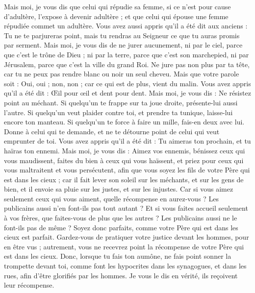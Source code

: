 \begin{multicols}{2}
Mais moi, je vous dis que celui qui répudie sa femme, si ce n'est pour cause d'adultère, l’expose à devenir adultère ; et que celui qui épouse une femme répudiée commet un adultère.
Vous avez aussi appris qu'il a été dit aux anciens : Tu ne te parjureras point, mais tu rendras au Seigneur ce que tu auras promis par serment.
Mais moi, je vous dis de ne jurer aucunement, ni par le ciel, parce que c'est le trône de Dieu ;
ni par la terre, parce que c'est son marchepied, ni par Jérusalem, parce que c'est la ville du grand Roi.
Ne jure pas non plus par ta tête, car tu ne peux pas rendre blanc ou noir un seul cheveu.
Mais que votre parole soit : Oui, oui ; non, non ; car ce qui est de plus, vient du malin.
Vous avez appris qu'il a été dit : Œil pour œil et dent pour dent.
Mais moi, je vous dis : Ne résistez point au méchant. Si quelqu'un te frappe sur ta joue droite, présente-lui aussi l'autre.
Si quelqu'un veut plaider contre toi, et prendre ta tunique, laisse-lui encore ton manteau.
Si quelqu'un te force à faire un mille, fais-en deux avec lui.
Donne à celui qui te demande, et ne te détourne point de celui qui veut emprunter de toi.
Vous avez appris qu'il a été dit : Tu aimeras ton prochain, et tu haïras ton ennemi.
Mais moi, je vous dis : Aimez vos ennemis, bénissez ceux qui vous maudissent, faites du bien à ceux qui vous haïssent, et priez pour ceux qui vous maltraitent et vous persécutent,
afin que vous soyez les fils de votre Père qui est dans les cieux ; car il fait lever son soleil sur les méchants, et sur les gens de bien, et il envoie sa pluie sur les justes, et sur les injustes.
Car si vous aimez seulement ceux qui vous aiment, quelle récompense en aurez-vous ? Les publicains aussi n'en font-ils pas tout autant ?
Et si vous faites accueil seulement à vos frères, que faites-vous de plus que les autres ? Les publicains aussi ne le font-ils pas de même ?
Soyez donc parfaits, comme votre Père qui est dans les cieux est parfait.
\VerseOne{}Gardez-vous de pratiquer votre justice devant les hommes, pour en être vus ; autrement, vous ne recevrez point la récompense de votre Père qui est dans les cieux.
Donc, lorsque tu fais ton aumône, ne fais point sonner la trompette devant toi, comme font les hypocrites dans les synagogues, et dans les rues, afin d’être glorifiés par les hommes. Je vous le dis en vérité, ils reçoivent leur récompense.

\end{multicols}
